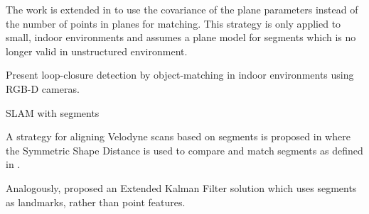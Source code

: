 The work is extended in \cite{fernandez2016scene} to use the covariance of the plane parameters instead of the number of points in planes for matching.  This strategy is only applied to small, indoor environments and assumes a plane model for segments which is no longer valid in unstructured environment.

\citet{finman2015icraws} Present loop-closure detection by object-matching in indoor environments using RGB-D cameras.



SLAM with segments

A strategy for aligning Velodyne scans based on segments is proposed in \cite{douillard2012scan} where the Symmetric Shape Distance is used to compare and match segments as defined in \cite{douillard2014pipeline}.

Analogously, \cite{nieto2006scan} proposed an Extended Kalman Filter solution which uses segments as landmarks, rather than point features.

% 
% 
% 
% 


